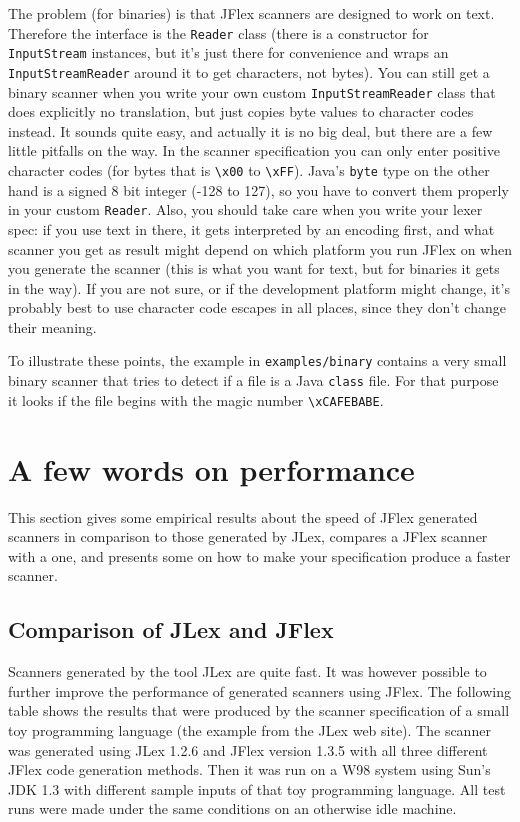 \documentclass[11pt]{scrartcl}
\begin{document}
The problem (for binaries) is that JFlex scanners are
designed to work on text. Therefore the interface is
the \texttt{Reader} class (there is a constructor
for \texttt{InputStream} instances, but it's just there
for convenience and wraps an \texttt{InputStreamReader}
around it to get characters, not bytes). 
You can still get a binary scanner when you write 
your own custom \texttt{InputStreamReader} class that
does explicitly no translation, but just copies
byte values to character codes instead. It sounds
quite easy, and actually it is no big deal, but there 
are a few little pitfalls on the way. In the scanner
specification you can only enter positive character
codes (for bytes that is \verb+\x00+
to \verb+\xFF+). Java's \texttt{byte} type on the other hand
is a signed 8 bit integer (-128 to 127), so you have to convert 
them properly in your custom \texttt{Reader}. Also, you should
take care when you write your lexer spec: if you
use text in there, it gets interpreted by an encoding
first, and what scanner you get as result might depend
on which platform you run JFlex on when you generate
the scanner (this is what you want for text, but for binaries it
gets in the way). If you are not sure, or if the development
platform might change, it's probably best to use character 
code escapes in all places, since they don't change their
meaning.

To illustrate these points, the example in \texttt{examples/binary} 
contains a very small binary scanner that tries to
detect if a file is a Java \texttt{class} file. For that
purpose it looks if the file begins with the magic number \verb+\xCAFEBABE+.

\section{A few words on performance\label{performance}}
This section gives some empirical results about the speed of JFlex generated
scanners in comparison to those generated by JLex,
compares a JFlex scanner with a  
one, and presents some  on how to make
your specification produce a faster scanner.

\subsection{Comparison of JLex and JFlex\label{PerformanceJLex}}
Scanners generated by the tool JLex are quite fast. It was however
possible to further improve the performance of generated scanners
using JFlex. The following table shows the results that were produced
by the scanner specification of a small toy programming language (the
example from the JLex web site). The scanner was generated using JLex
1.2.6 and JFlex version 1.3.5 with all three different JFlex code
generation methods. Then it was run on a W98 system using Sun's JDK
1.3 with different sample inputs of that toy programming language. All
test runs were made under the same conditions on an otherwise idle
machine.
\end{document}
